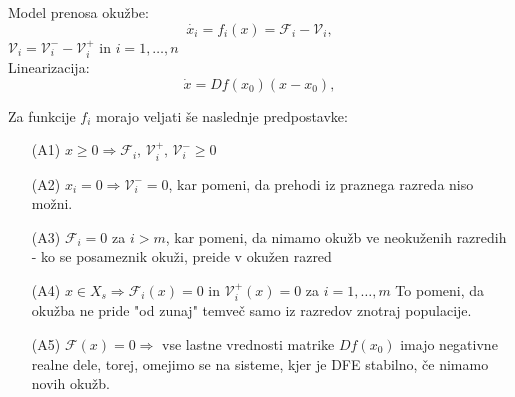 \documentclass[11pt]{beamer}
\newcommand{\F}{\mathcal F}
\newcommand{\V}{\mathcal V}
\begin{document}
\begin{frame}
    Model prenosa okužbe:
    \begin{equation} \label{eq1}
        \dot{x_i}=f_i(x)=\F_i - \V_i,
    \end{equation}
    \(\V_i=\V_i^- - \V_i^+\) in \(i=1,\ldots,n\)\\
    Linearizacija:
    \begin{equation} \label{eq2}
        \dot{x}=Df(x_0)(x-x_0),
    \end{equation}
\end{frame}

\begin{frame}
    Za funkcije \(f_i\) morajo veljati še naslednje predpostavke:
    \begin{itemize}
        \item[(A1)] \(x\geq 0 \Rightarrow \F_i\textrm{, }\V_i^+\textrm{, }\V_i^- \geq 0\)
        \item[(A2)] \(x_i=0 \Rightarrow \V_i^- =0\), kar pomeni, da prehodi iz praznega 
        razreda niso možni. 
        \item[(A3)] \(\F_i=0\) za \(i>m\), kar pomeni, da nimamo okužb ve neokuženih razredih - 
        ko se posameznik okuži, preide v okužen razred 
        \item[(A4)] \(x\in X_s \Rightarrow \F_i(x)=0\) in \(\V_i^+(x)=0\) za \(i=1,\ldots,m\)
        To pomeni, da okužba ne pride "od zunaj" temveč samo iz razredov znotraj populacije. 
        \item[(A5)] \(\F(x)=0 \Rightarrow\) vse lastne vrednosti matrike \(Df(x_0)\) imajo 
        negativne realne dele, torej, omejimo se na sisteme, kjer je DFE stabilno, če nimamo novih okužb.    
    \end{itemize}
\end{frame}
\end{document}
